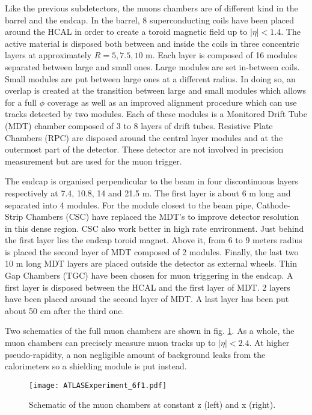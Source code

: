 Like the previous subdetectors, the muons chambers are of different kind in the barrel and the endcap.
In the barrel, 8 superconducting coils have been placed around the HCAL in order to create a toroid magnetic field up to $|\eta|<1.4$.
The active material is disposed both between and inside the coils in three concentric layers at approximately \(R=5,7.5,10\) m.
Each layer is composed of 16 modules separated between large and small ones.
Large modules are set in-between coils.
Small modules are put between large ones at a different radius.
In doing so, an overlap is created at the transition between large and small modules which allows for a full $\phi$ coverage as well as an improved alignment procedure which can use tracks detected by two modules.
Each of these modules is a Monitored Drift Tube (MDT) chamber composed of 3 to 8 layers of drift tubes.
Resistive Plate Chambers (RPC) are disposed around the central layer modules and at the outermost part of the detector.
These detector are not involved in precision measurement but are used for the muon trigger.

The endcap is organised perpendicular to the beam in four discontinuous layers respectively at 7.4, 10.8, 14 and 21.5 m.
The first layer is about 6 m long and separated into 4 modules.
For the module closest to the beam pipe, Cathode-Strip Chambers (CSC) have replaced the MDT's to improve detector resolution in this dense region.
CSC also work better in high rate environment.
Just behind the first layer lies the endcap toroid magnet.
Above it, from 6 to 9 meters radius is placed the second layer of MDT composed of 2 modules.
Finally, the last two 10 m long MDT layers are placed outside the detector as external wheels.
Thin Gap Chambers (TGC) have been chosen for muon triggering in the endcap.
A first layer is disposed between the HCAL and the first layer of MDT.
2 layers have been placed around the second layer of MDT.
A last layer has been put about 50 cm after the third one.


Two schematics of the full muon chambers are shown in fig. \ref{fig:orgd7a60b3}.
As a whole, the muon chambers can precisely measure muon tracks up to $|\eta|<2.4$. %
At higher pseudo-rapidity, a non negligible amount of background leaks from the calorimeters so a shielding module is put instead.

\begin{figure}[htbp]
\centering
\texttt{[image: ATLASExperiment\_6f1.pdf]}
\caption{\label{fig:orgd7a60b3}
Schematic of the muon chambers at constant z (left) and x (right).\cite{ATLASExperiment}}
\end{figure}




